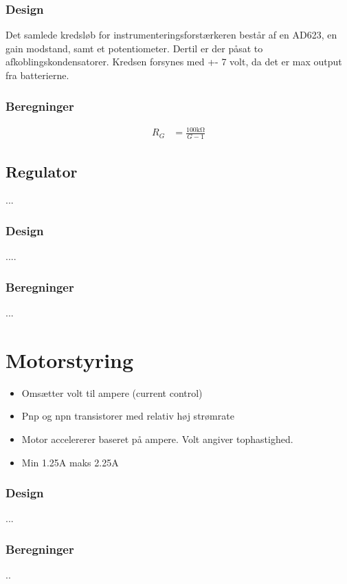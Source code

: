 \subsubsection{Design}
Det samlede kredsløb for instrumenteringsforstærkeren består af en AD623, en gain modstand, samt et potentiometer. Dertil er der påsat to afkoblingskondensatorer. Kredsen forsynes med +- 7 volt, da det er max output fra batterierne.


\subsubsection{Beregninger}

\begin{align}
	R_G & = \frac{100 \si{\kilo\ohm}}{G-1} 
	\end{align}


\subsection{Regulator}
...

\subsubsection{Design}

....

\subsubsection{Beregninger}
...


\section{Motorstyring}\label{sec:sec_motorstyring}

\begin{itemize}
	\item Omsætter volt til ampere (current control)
	\item Pnp og npn transistorer med relativ høj strømrate
	\item Motor accelererer baseret på ampere. Volt angiver tophastighed.
	\item Min 1.25A maks 2.25A
\end{itemize}

\subsubsection{Design}
...

\subsubsection{Beregninger}
..
